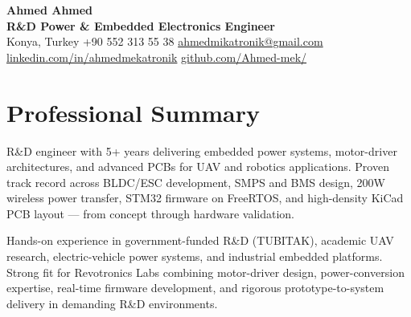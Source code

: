 \documentclass[a4paper,10pt]{article}
\begin{document}
\begin{center}
  {\LARGE \textbf{\color{navyblue}Ahmed Ahmed}}\\
  \vspace{3pt}
  {\large \textbf{R\&D Power \& Embedded Electronics Engineer}}\\
  \vspace{4pt}
  \small
  Konya, Turkey
  \;\textbullet\;
  +90 552 313 55 38
  \;\textbullet\;
  \href{mailto:ahmedmikatronik@gmail.com}{ahmedmikatronik@gmail.com}
  \;\textbullet\;
  \href{https://www.linkedin.com/in/ahmedmekatronik/}{linkedin.com/in/ahmedmekatronik}
  \;\textbullet\;
  \href{https://github.com/Ahmed-mek/}{github.com/Ahmed-mek/}
\end{center}

\vspace{2pt}

\section*{Professional Summary}
R\&D engineer with 5+ years delivering embedded power systems, motor-driver architectures, and
advanced PCBs for UAV and robotics applications. Proven track record across BLDC/ESC
development, SMPS and BMS design, 200W wireless power transfer, STM32 firmware on FreeRTOS,
and high-density KiCad PCB layout --- from concept through hardware validation.

Hands-on experience in government-funded R\&D (TUBITAK), academic UAV research,
electric-vehicle power systems, and industrial embedded platforms. Strong fit for Revotronics
Labs combining motor-driver design, power-conversion expertise, real-time firmware development,
and rigorous prototype-to-system delivery in demanding R\&D environments.

\end{document}
